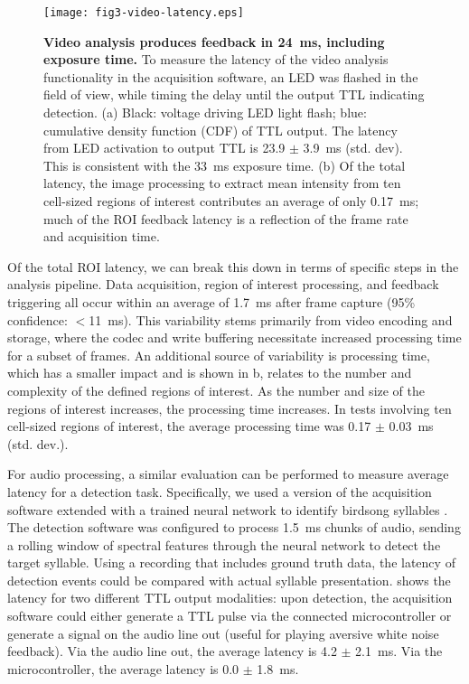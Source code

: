 \begin{figure}
\texttt{[image: fig3-video-latency.eps]}
\caption[Latency for video processing]{\textbf{Video analysis 
produces feedback in 24~ms, including exposure time.} To measure 
the latency of the video analysis functionality in the 
acquisition software, an LED was flashed in the field of view,
while timing the delay until the output TTL indicating detection. 
(a) Black: voltage driving LED light flash; blue: cumulative density 
function (CDF) of TTL output. The latency from LED activation to 
output TTL is 23.9 $\pm$ 3.9~ms (std. dev). This is consistent
with the 33~ms exposure time. (b) Of the total latency, the image 
processing to extract mean intensity from ten cell-sized regions 
of interest contributes an average of only 0.17~ms; much of the 
ROI feedback latency is a reflection of the frame rate and 
acquisition time.}
\label{fig:video-latency}
\end{figure}

Of the total ROI latency, we can break this down in terms of 
specific steps in the analysis pipeline. Data acquisition, 
region of interest processing, and feedback triggering all 
occur within an average of 1.7~ms after frame 
capture (95\% confidence: $<$11~ms). This variability stems primarily 
from video encoding and storage, where the codec and write buffering 
necessitate increased processing time for a subset of frames. An 
additional  source of variability is processing time, which has a 
smaller impact and is shown in b, relates 
to the number and 
complexity of the defined regions of interest. As the number and size 
of the regions of interest increases, the processing time increases. 
In tests involving ten cell-sized regions of interest, the average 
processing time was 0.17 $\pm$ 0.03~ms (std. dev.).

For audio processing, a similar evaluation can be performed to 
measure average latency for a detection task. Specifically, we 
used a version of the acquisition software extended with a 
trained neural network to identify birdsong syllables 
\cite{Pearre:2017cs}. The detection software was configured to 
process 1.5~ms chunks of audio, sending a rolling window of 
spectral features through the neural network to detect the 
target syllable. Using a recording that includes ground 
truth data, the latency of detection events could be compared 
with actual syllable presentation.  
shows the latency for two different TTL output modalities: 
upon detection, the acquisition software could either 
generate a TTL pulse via the connected microcontroller or 
generate a signal on the audio line out (useful for playing 
aversive white noise feedback). Via the audio line out, the 
average latency is 4.2 $\pm$ 2.1~ms. Via the microcontroller,
the average latency is 0.0 $\pm$ 1.8~ms. 


